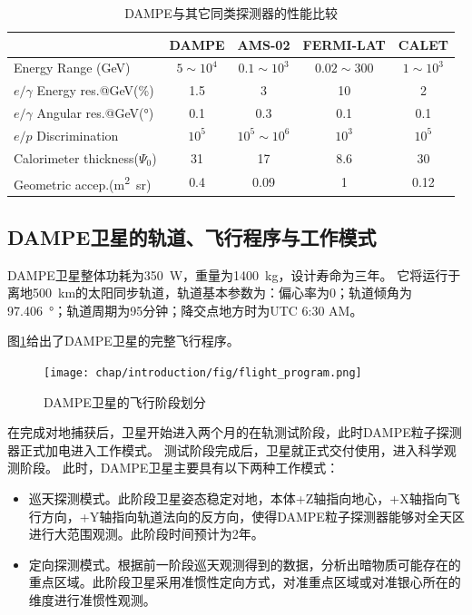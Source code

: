 \begin{table}[htb]
	\centering
	\caption{DAMPE与其它同类探测器的性能比较}
	\label{tab:introduction:dampe_comparison}
	\begin{threeparttable}
	\begin{tabulary}{\linewidth}{LCCCC}
		\toprule[1.5pt]
		  & DAMPE & AMS-02 & FERMI-LAT & CALET \\ 
		\midrule[1pt]
		Energy Range (\si{GeV}) & $5\sim10^4$ & $0.1\sim10^3$ & $0.02\sim300$ & $1\sim10^3$ \\ 
		$e/\gamma$ Energy res.@\si{GeV}(\si{\percent}) & 1.5 & 3 & 10 & 2 \\ 
		$e/\gamma$ Angular res.@\si{GeV}(\si{\degree}) & 0.1 & 0.3 & 0.1 & 0.1 \\ 
		$e/p$ Discrimination& $10^5$ & $10^5\sim10^6$ & $10^3$ & $10^5$ \\ 
		Calorimeter thickness($\Psi_0$) & 31 & 17 & 8.6 & 30 \\ 
		Geometric accep.(\si{\meter\squared\steradian}) & 0.4 & 0.09 & 1 & 0.12 \\ 
		\bottomrule[1.5pt] 
	\end{tabulary}
	\end{threeparttable}
\end{table}

\subsection{DAMPE卫星的轨道、飞行程序与工作模式}

DAMPE卫星整体功耗为\SI{350}{W}，重量为\SI{1400}{kg}，设计寿命为三年\parencite{psd_tdr}。
它将运行于离地\SI{500}{\kilo\meter}的太阳同步轨道，轨道基本参数为：偏心率为0；轨道倾角为\SI{97.406}{\degree}；轨道周期为95分钟；降交点地方时为UTC 6:30 AM。

图\ref{fig:introduction:flight_program}给出了DAMPE卫星的完整飞行程序。
\begin{figure}[htbp]
	\centering
	\texttt{[image: chap/introduction/fig/flight\_program.png]}
	\caption{DAMPE卫星的飞行阶段划分}
	\label{fig:introduction:flight_program}
\end{figure}
在完成对地捕获后，卫星开始进入两个月的在轨测试阶段，此时DAMPE粒子探测器正式加电进入工作模式。
测试阶段完成后，卫星就正式交付使用，进入科学观测阶段。
此时，DAMPE卫星主要具有以下两种工作模式：
\begin{itemize}
	\item 巡天探测模式。此阶段卫星姿态稳定对地，本体+Z轴指向地心，+X轴指向飞行方向，+Y轴指向轨道法向的反方向，使得DAMPE粒子探测器能够对全天区进行大范围观测。此阶段时间预计为2年。
	\item 定向探测模式。根据前一阶段巡天观测得到的数据，分析出暗物质可能存在的重点区域。此阶段卫星采用准惯性定向方式，对准重点区域或对准银心所在的维度进行准惯性观测。
\end{itemize}


